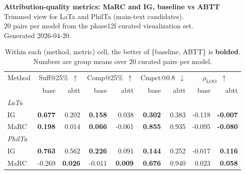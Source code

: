 \documentclass[11pt]{article}
\begin{document}
\begin{center}
{\large\bfseries Attribution-quality metrics: MaRC and IG, baseline vs ABTT}\\[2pt]
{\small Trimmed view for LaTa and PhilTa (main-text candidates).\\
20 pairs per model from the phase12f curated visualization set.\\
Generated 2026-04-20.}
\end{center}

\vspace{0.4em}

\begin{table}[h]
\centering
\footnotesize
\setlength{\tabcolsep}{3pt}
\begin{tabular}{lrrrrrrrr}
\toprule
Method & \multicolumn{2}{c}{Suff@25\%~$\uparrow$} & \multicolumn{2}{c}{Comp@25\%~$\uparrow$} & \multicolumn{2}{c}{Cmpct@0.8~$\downarrow$} & \multicolumn{2}{c}{$\rho_{\text{LOO}}$~$\uparrow$} \\
\cmidrule(lr){2-3} \cmidrule(lr){4-5} \cmidrule(lr){6-7} \cmidrule(lr){8-9}
 & base & abtt & base & abtt & base & abtt & base & abtt \\
\midrule
\multicolumn{9}{l}{\textit{LaTa}} \\
IG            & \textbf{0.677} & 0.202 & \textbf{0.158} & 0.038  & \textbf{0.302} & 0.383 & -0.118 & \textbf{-0.007} \\
MaRC          & \textbf{0.198} & 0.014 & \textbf{0.066} & -0.061 & \textbf{0.855} & 0.935 & -0.095 & \textbf{-0.080} \\
\midrule
\multicolumn{9}{l}{\textit{PhilTa}} \\
IG            & \textbf{0.763} & 0.562          & \textbf{0.226} & 0.091          & \textbf{0.144} & 0.252 & -0.017 & \textbf{0.116} \\
MaRC          & -0.269         & \textbf{0.026} & -0.011         & \textbf{0.009} & \textbf{0.676} & 0.940 & 0.023  & \textbf{0.058} \\
\bottomrule
\end{tabular}
\caption*{Within each (method, metric) cell, the better of \{baseline, ABTT\} is \textbf{bolded}. Numbers are group means over 20 curated pairs per model.}
\end{table}

\vspace{0.8em}
\end{document}

